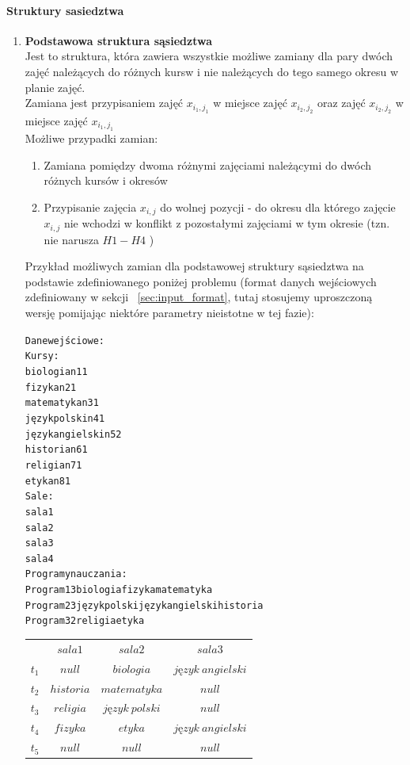 \paragraph{Struktury sasiedztwa}
\begin{enumerate}
\item \textbf{Podstawowa struktura sąsiedztwa} \\
Jest to struktura, która zawiera wszystkie możliwe zamiany dla pary dwóch zajęć należących do różnych kursw i nie należących do tego samego okresu w planie zajęć. \\
Zamiana jest przypisaniem zajęć $x_{i_{1},j_{1}}$ w miejsce zajęć ${x_{i_{2}, j_{2}}}$ oraz zajęć ${x_{i_{2}, j_{2}}}$ w miejsce zajęć $x_{i_{1},j_{1}}$ \\
Możliwe przypadki zamian:
\begin{enumerate}
\item Zamiana pomiędzy dwoma różnymi zajęciami należącymi do dwóch różnych kursów i okresów
\item Przypisanie zajęcia ${x_{i,j}}$ do wolnej pozycji - do okresu dla którego zajęcie ${x_{i,j}}$ nie wchodzi w konflikt z pozostałymi zajęciami w tym okresie (tzn. nie narusza ${H1-H4}$ )
\end{enumerate}
Przykład możliwych zamian dla podstawowej struktury sąsiedztwa na podstawie zdefiniowanego poniżej problemu (format danych wejściowych zdefiniowany w sekcji ~\ref{sec:input_format}, tutaj stosujemy uproszczoną wersję pomijając niektóre parametry nieistotne w tej fazie):
\begin{alltt}
Dane wejściowe:
Kursy: 
biologia n1 1
fizyka n2 1
matematyka n3 1
język polski n4 1
język angielski n5 2
historia n6 1
religia n7 1
etyka n8 1
Sale: 
sala1
sala2
sala3
sala4
Programy nauczania:
Program1 3 biologia fizyka matematyka
Program2 3 język polski język angielski historia
Program3 2 religia etyka
\end{alltt}

\begin{table}[H]
\begin{center}
\begin{tabular}{ r|c|c|c| }
\multicolumn{1}{r}{}
 &  \multicolumn{1}{c}{$sala1$}
 & \multicolumn{1}{c}{$sala2$} 
 & \multicolumn{1}{c}{$sala3$} 
 \\
\cline{2-4}
$t_{1}$ & $null$ & $biologia$ & $język\ angielski$  \\
\cline{2-4}
$t_{2}$ & $historia$ & $matematyka$  & $null$ \\
\cline{2-4}
$t_{3}$ & $religia$ & $język\ polski$  & $null$ \\
\cline{2-4}
$t_{4}$ & $fizyka$ & $etyka$ & $język\ angielski$ \\
\cline{2-4}
$t_{5}$ & $null$ & $null$ & $null$ \\
\cline{2-4}
\end{tabular}
\end{center}


\end{table}
\end{enumerate}

